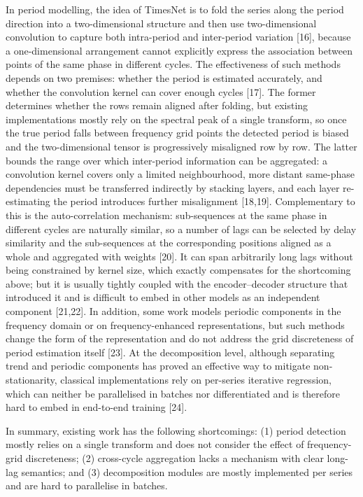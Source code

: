 \documentclass{iopjournal}
\begin{document}
In period modelling, the idea of TimesNet is to fold the series along the period direction into a two-dimensional structure and then use two-dimensional convolution to capture both intra-period and inter-period variation [16], because a one-dimensional arrangement cannot explicitly express the association between points of the same phase in different cycles. The effectiveness of such methods depends on two premises: whether the period is estimated accurately, and whether the convolution kernel can cover enough cycles [17]. The former determines whether the rows remain aligned after folding, but existing implementations mostly rely on the spectral peak of a single transform, so once the true period falls between frequency grid points the detected period is biased and the two-dimensional tensor is progressively misaligned row by row. The latter bounds the range over which inter-period information can be aggregated: a convolution kernel covers only a limited neighbourhood, more distant same-phase dependencies must be transferred indirectly by stacking layers, and each layer re-estimating the period introduces further misalignment [18,19]. Complementary to this is the auto-correlation mechanism: sub-sequences at the same phase in different cycles are naturally similar, so a number of lags can be selected by delay similarity and the sub-sequences at the corresponding positions aligned as a whole and aggregated with weights [20]. It can span arbitrarily long lags without being constrained by kernel size, which exactly compensates for the shortcoming above; but it is usually tightly coupled with the encoder--decoder structure that introduced it and is difficult to embed in other models as an independent component [21,22]. In addition, some work models periodic components in the frequency domain or on frequency-enhanced representations, but such methods change the form of the representation and do not address the grid discreteness of period estimation itself [23]. At the decomposition level, although separating trend and periodic components has proved an effective way to mitigate non-stationarity, classical implementations rely on per-series iterative regression, which can neither be parallelised in batches nor differentiated and is therefore hard to embed in end-to-end training [24].

In summary, existing work has the following shortcomings: (1) period detection mostly relies on a single transform and does not consider the effect of frequency-grid discreteness; (2) cross-cycle aggregation lacks a mechanism with clear long-lag semantics; and (3) decomposition modules are mostly implemented per series and are hard to parallelise in batches.
\end{document}
